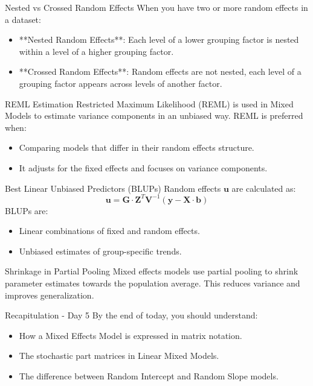 \documentclass{beamer}
\begin{document}
\begin{frame}{Nested vs Crossed Random Effects}
When you have two or more random effects in a dataset:
\begin{itemize}
  \item **Nested Random Effects**: Each level of a lower grouping factor is nested within a level of a higher grouping factor.
  \item **Crossed Random Effects**: Random effects are not nested, each level of a grouping factor appears across levels of another factor.
\end{itemize}
\end{frame}

\begin{frame}{REML Estimation}
Restricted Maximum Likelihood (REML) is used in Mixed Models to estimate variance components in an unbiased way. REML is preferred when:
\begin{itemize}
  \item Comparing models that differ in their random effects structure.
  \item It adjusts for the fixed effects and focuses on variance components.
\end{itemize}
\end{frame}

\begin{frame}{Best Linear Unbiased Predictors (BLUPs)}
Random effects $\mathbf{u}$ are calculated as:
\[
\mathbf{u} = \mathbf{G} \cdot \mathbf{Z}^T \mathbf{V}^{-1} (\mathbf{y} - \mathbf{X} \cdot \mathbf{b})
\]
BLUPs are:
\begin{itemize}
  \item Linear combinations of fixed and random effects.
  \item Unbiased estimates of group-specific trends.
\end{itemize}
\end{frame}

\begin{frame}{Shrinkage in Partial Pooling}
Mixed effects models use partial pooling to shrink parameter estimates towards the population average. This reduces variance and improves generalization.
\end{frame}

\begin{frame}{Recapitulation - Day 5}
By the end of today, you should understand:
\begin{itemize}
  \item How a Mixed Effects Model is expressed in matrix notation.
  \item The stochastic part matrices in Linear Mixed Models.
  \item The difference between Random Intercept and Random Slope models.
\end{itemize}
\end{frame}
\end{document}
